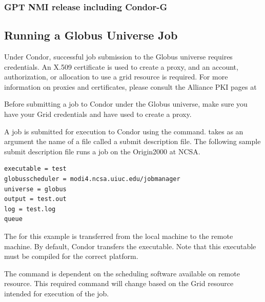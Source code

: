 \subsubsection{\label{sec:Condor-G-GPTNMI}GPT NMI release including Condor-G}
\Todo

\subsection{\label{sec:Running-CondorG-Job}Running a Globus Universe Job}

Under Condor, successful job submission to the Globus universe requires
credentials.
An X.509 certificate is used to create a proxy,
and an account, authorization, or allocation to use a grid resource
is required.
For more information on proxies and certificates,
please consult the Alliance PKI pages at 


Before submitting a job to Condor under the Globus universe,
make sure you have your Grid 
credentials and have used  to create a proxy.

A job is submitted for execution to Condor using the
 command.
 takes as an argument
the name of a file called a submit description file.
The following sample submit description file runs a job on
the Origin2000 at NCSA.

\begin{verbatim}
executable = test
globusscheduler = modi4.ncsa.uiuc.edu/jobmanager
universe = globus
output = test.out
log = test.log
queue
\end{verbatim} 

The 
for this example is
transferred from the local machine to the remote machine.
By default, Condor transfers the executable.
Note that this executable must be compiled for the correct
platform.

The  command is dependent on the
scheduling software available on remote resource.
This required command will change based on the Grid resource
intended for execution of the job.

